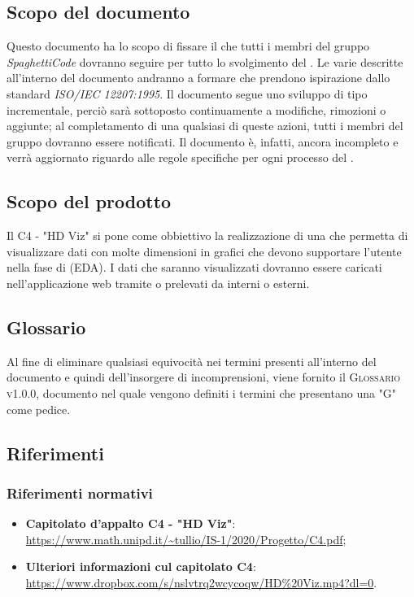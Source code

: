 \documentclass[../norme_di_progetto.tex]{subfiles}
\begin{document}
\subsection{Scopo del documento}
Questo documento ha lo scopo di fissare il  che tutti i membri del gruppo \emph{SpaghettiCode} dovranno seguire per tutto lo svolgimento del . Le varie  descritte all'interno del documento andranno a formare  che prendono ispirazione dallo standard \emph{ISO/IEC 12207:1995}. Il documento segue uno sviluppo di tipo incrementale, perciò sarà sottoposto continuamente a modifiche, rimozioni o aggiunte; al completamento di una qualsiasi di queste azioni, tutti i membri del gruppo dovranno essere notificati. Il documento è, infatti, ancora incompleto e verrà aggiornato riguardo alle regole specifiche per ogni processo del .

\subsection{Scopo del prodotto}
Il  C4 - "HD Viz" si pone come obbiettivo la realizzazione di una  che permetta di visualizzare dati con molte dimensioni in grafici che devono supportare l'utente nella fase di  (EDA).
I dati che saranno visualizzati dovranno essere caricati nell'applicazione web tramite  o prelevati da  interni o esterni.

\subsection{Glossario}
Al fine di eliminare qualsiasi equivocità nei termini presenti all'interno del documento e quindi dell'insorgere di incomprensioni, viene fornito il \textsc{Glossario v1.0.0}, documento nel quale vengono definiti i termini che presentano una "G" come pedice.

\subsection{Riferimenti}
\subsubsection{Riferimenti normativi}
\begin{itemize}
    \item \textbf{Capitolato d'appalto C4 - "HD Viz"}: \\
    \url{https://www.math.unipd.it/~tullio/IS-1/2020/Progetto/C4.pdf};
    \item \textbf{Ulteriori informazioni cul capitolato C4}: \\
    \url{https://www.dropbox.com/s/nslvtrq2wcycoqw/HD\%20Viz.mp4?dl=0}.
\end{itemize}
\end{document}
